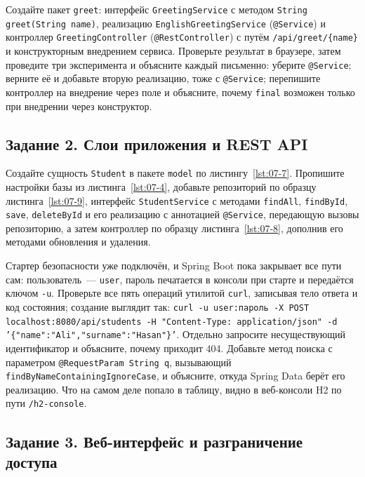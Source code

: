Создайте пакет \texttt{greet}: интерфейс \texttt{GreetingService} с методом
\texttt{String greet(String name)}, реализацию
\texttt{EnglishGreetingService} (\texttt{@Service}) и контроллер
\texttt{GreetingController} (\texttt{@RestController}) с путём
\texttt{/api/greet/\{name\}} и конструкторным внедрением сервиса. Проверьте
результат в браузере, затем проведите три эксперимента и объясните каждый
письменно: уберите \texttt{@Service}; верните её и добавьте вторую
реализацию, тоже с \texttt{@Service}; перепишите контроллер на внедрение
через поле и объясните, почему \texttt{final} возможен только при внедрении
через конструктор.

\subsection*{Задание 2. Слои приложения и REST API}

Создайте сущность \texttt{Student} в пакете \texttt{model} по
листингу~\ref{lst:07-7}. Пропишите настройки базы
из листинга~\ref{lst:07-4}, добавьте репозиторий по образцу
листинга~\ref{lst:07-9}, интерфейс \texttt{StudentService} с методами
\texttt{findAll}, \texttt{findById}, \texttt{save}, \texttt{deleteById} и его
реализацию с аннотацией \texttt{@Service}, передающую вызовы репозиторию, а
затем контроллер по образцу листинга~\ref{lst:07-8}, дополнив его методами
обновления и удаления.

Стартер безопасности уже подключён, и Spring Boot пока закрывает все пути
сам: пользователь~--- \texttt{user}, пароль печатается в консоли при старте и
передаётся ключом \texttt{-u}. Проверьте все пять операций утилитой
\texttt{curl}, записывая тело ответа и код состояния;
создание выглядит так: \texttt{curl -u user:пароль -X POST
localhost:8080/api/students -H "Content-Type: application/json" -d
'\{"name":"Ali","surname":"Hasan"\}'}. Отдельно
запросите несуществующий идентификатор и объясните, почему приходит 404.
Добавьте метод поиска с параметром \texttt{@RequestParam String q},
вызывающий \texttt{findByNameContainingIgnoreCase}, и объясните, откуда
Spring Data берёт его реализацию. Что на самом деле попало в таблицу, видно
в веб-консоли H2 по пути \texttt{/h2-console}.

\subsection*{Задание 3. Веб-интерфейс и разграничение доступа}

